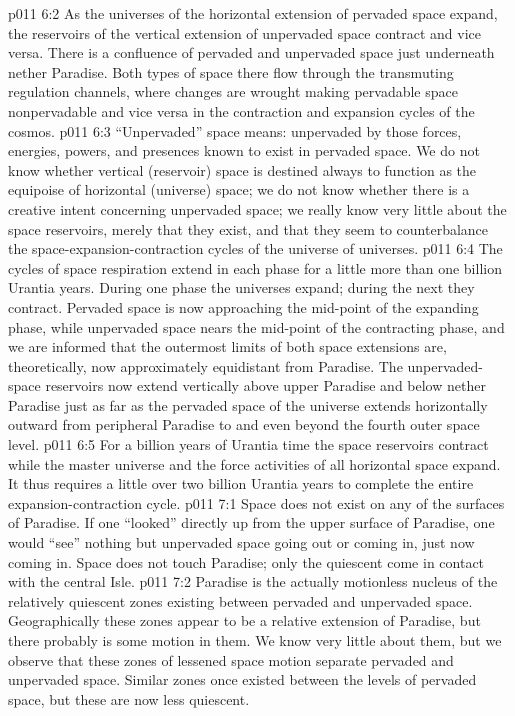 \vs p011 6:2 As the universes of the horizontal extension of pervaded space expand, the reservoirs of the vertical extension of unpervaded space contract and vice versa. There is a confluence of pervaded and unpervaded space just underneath nether Paradise. Both types of space there flow through the transmuting regulation channels, where changes are wrought making pervadable space nonpervadable and vice versa in the contraction and expansion cycles of the cosmos.
\vs p011 6:3 \pc “Unpervaded” space means: unpervaded by those forces, energies, powers, and presences known to exist in pervaded space. We do not know whether vertical (reservoir) space is destined always to function as the equipoise of horizontal (universe) space; we do not know whether there is a creative intent concerning unpervaded space; we really know very little about the space reservoirs, merely that they exist, and that they seem to counterbalance the space\hyp{}expansion\hyp{}contraction cycles of the universe of universes.
\vs p011 6:4 \pc The cycles of space respiration extend in each phase for a little more than one billion Urantia years. During one phase the universes expand; during the next they contract. Pervaded space is now approaching the mid\hyp{}point of the expanding phase, while unpervaded space nears the mid\hyp{}point of the contracting phase, and we are informed that the outermost limits of both space extensions are, theoretically, now approximately equidistant from Paradise. The unpervaded\hyp{}space reservoirs now extend vertically above upper Paradise and below nether Paradise just as far as the pervaded space of the universe extends horizontally outward from peripheral Paradise to and even beyond the fourth outer space level.
\vs p011 6:5 For a billion years of Urantia time the space reservoirs contract while the master universe and the force activities of all horizontal space expand. It thus requires a little over two billion Urantia years to complete the entire expansion\hyp{}contraction cycle.
\vs p011 7:1 Space does not exist on any of the surfaces of Paradise. If one “looked” directly up from the upper surface of Paradise, one would “see” nothing but unpervaded space going out or coming in, just now coming in. Space does not touch Paradise; only the quiescent  come in contact with the central Isle.
\vs p011 7:2 Paradise is the actually motionless nucleus of the relatively quiescent zones existing between pervaded and unpervaded space. Geographically these zones appear to be a relative extension of Paradise, but there probably is some motion in them. We know very little about them, but we observe that these zones of lessened space motion separate pervaded and unpervaded space. Similar zones once existed between the levels of pervaded space, but these are now less quiescent.
